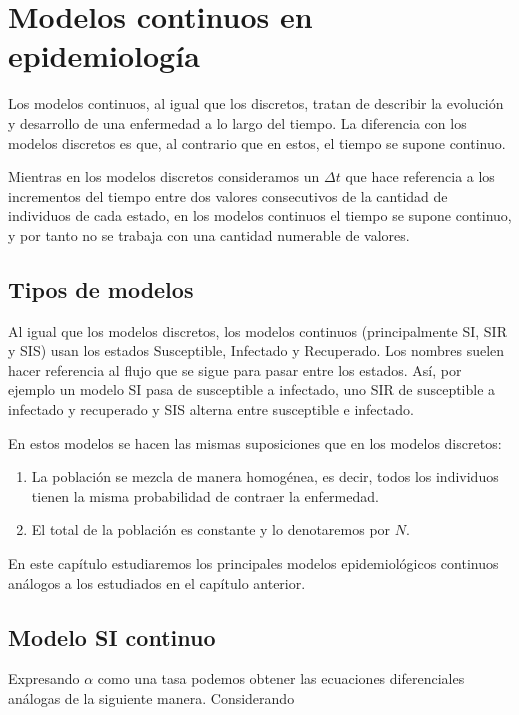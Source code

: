 \chapter{Modelos continuos en epidemiología}

Los modelos continuos, al igual que los discretos, tratan de describir la evolución y desarrollo de una enfermedad a lo largo del tiempo. La diferencia con los modelos discretos es que, al contrario que en estos, el tiempo se supone continuo.

Mientras en los modelos discretos consideramos un $\Delta t$ que hace referencia a los incrementos del tiempo entre dos valores consecutivos de la cantidad de individuos de cada estado, en los modelos continuos el tiempo se supone continuo, y por tanto no se trabaja con una cantidad numerable de valores.

\section{Tipos de modelos}

Al igual que los modelos discretos, los modelos continuos (principalmente SI, SIR y SIS) usan los estados Susceptible, Infectado y Recuperado. Los nombres suelen hacer referencia al flujo que se sigue para pasar entre los estados. Así, por ejemplo un modelo SI pasa de susceptible a infectado, uno SIR de susceptible a infectado y recuperado y SIS alterna entre susceptible e infectado.

En estos modelos se hacen las mismas suposiciones que en los modelos discretos:
\begin{enumerate}
\item La población se mezcla de manera homogénea, es decir, todos los individuos tienen la misma probabilidad de contraer la enfermedad.
\item El total de la población es constante y lo denotaremos por $N$.
\end{enumerate}

En este capítulo estudiaremos los principales modelos epidemiológicos continuos análogos a los estudiados en el capítulo anterior.


\section{Modelo SI continuo}

Expresando $\alpha$ como una tasa podemos obtener las ecuaciones diferenciales análogas de la siguiente manera. Considerando

